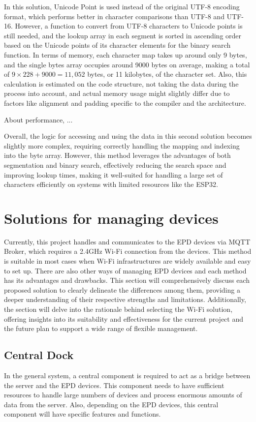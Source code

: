 \documentclass[../Main.tex]{subfiles}
\begin{document}
In this solution, Unicode Point is used instead of the original UTF-8 encoding format, which performs better in character comparisons than UTF-8 and UTF-16. However, a function to convert from UTF-8 characters to Unicode points is still needed, and the lookup array in each segment is sorted in ascending order based on the Unicode points of its character elements for the binary search function. In terms of memory, each character map takes up around only 9 bytes, and the single bytes array occupies around 9000 bytes on average, making a total of \(9\times228+9000=11,052\) bytes, or 11 kilobytes, of the character set. Also, this calculation is estimated on the code structure, not taking the data during the process into account, and actual memory usage might slightly differ due to factors like alignment and padding specific to the compiler and the architecture.

About performance, ...

Overall, the logic for accessing and using the data in this second solution becomes slightly more complex, requiring correctly handling the mapping and indexing into the byte array. However, this method leverages the advantages of both segmentation and binary search, effectively reducing the search space and improving lookup times, making it well-suited for handling a large set of characters efficiently on systems with limited resources like the ESP32.

\section{Solutions for managing devices}
Currently, this project handles and communicates to the \gls{EPD} devices via MQTT Broker, which requires a 2.4GHz Wi-Fi connection from the devices. This method is suitable in most cases when Wi-Fi infrastructures are widely available and easy to set up. There are also other ways of managing \gls{EPD} devices and each method has its advantages and drawbacks. This section will comprehensively discuss each proposed solution to clearly delineate the differences among them, providing a deeper understanding of their respective strengths and limitations. Additionally, the section will delve into the rationale behind selecting the Wi-Fi solution, offering insights into its suitability and effectiveness for the current project and the future plan to support a wide range of flexible management.

\subsection{Central Dock}
In the general system, a central component is required to act as a bridge between the server and the \gls{EPD} devices. This component needs to have sufficient resources to handle large numbers of devices and process enormous amounts of data from the server. Also, depending on the \gls{EPD} devices, this central component will have specific features and functions.
\end{document}
